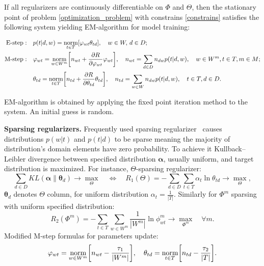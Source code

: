 \documentclass[12pt, twoside]{article}
\begin{document}
\begin{Theorem}
If all regularizers are continuously differentiable on $\Phi$ and $\Theta$, then the stationary point of problem \eqref{optimization_problem} with constrains \eqref{constrains} satisfies the following system yielding EM-algorithm for model training:

\begin{equation}
\label{EM_alrorithm}
	\begin{split}
	 \text{E-step}: \quad & p(t|d, w) = \norm\limits_{t \in T} [\phi_{wt} \theta_{td}], \quad w \in W, \, d \in D ;\\
	 \text{M-step}: \quad & \phi_{wt} = \norm\limits_{w \in W^m} \biggl[n_{wt} + \frac{\partial R}{\partial \phi_{wt}} \phi_{wt}\biggr], \quad n_{wt} = \sum_{d \in D} n_{dw} p(t| d, w), \quad w \in W^m, t \in T, m \in M;\\
	 & \theta_{td} = \norm\limits_{t \in T} \biggl[n_{td} + \frac{\partial R}{\partial \theta_{td}} \theta_{td}\biggr], \quad n_{td} = \sum_{w \in W} n_{dw} p(t| d, w), \quad t \in T, d \in D.
	 \end{split}
\end{equation}
\end{Theorem}
EM-algorithm is obtained by applying the fixed point iteration method to the system. An initial guess is random.

\textbf{Sparsing regularizers.} Frequently used sparsing regularizer~\cite{ARTM} causes distributions $p(w|t)$ and $p(t|d)$ to be sparse meaning the majority of distribution's domain elements have zero probability. To achieve it Kullback–Leibler divergence between specified distribution $\bm \alpha$, usually uniform, and target distribution is maximized. For instance, $\Theta$-sparsing regularizer:
\[
\sum_{d \in D} KL(\bm \alpha \| \bm \theta_d) \rightarrow \max_{\Theta} 
\quad
\Leftrightarrow
\quad
R_1(\Theta) = 
 - \sum_{d \in D} \sum_{t \in T} \alpha_t \ln \theta_{td} \rightarrow \max_{\Theta},
\]
$\bm \theta_d$ denotes $\Theta$ column, for uniform distribution $\alpha_t = \frac 1 {|T|}$. Similarly for $\Phi^m$ sparsing with uniform specified distribution:
\[
R_2(\Phi^m) = -\sum_{t \in T} \sum_{w \in W^m} \frac 1 {|W^m|} \ln \phi^m_{wt} \rightarrow \max_{\Phi^m} \quad \forall m.
\] 
Modified M-step formulas for parameters update:
\begin{equation}
\label{sparsing_M_step}
\phi_{wt} = \norm\limits_{w \in W^m} \biggl[n_{wt} - \frac {\tau_1} {|W^m|}\biggr],
\quad
\theta_{td} = \norm\limits_{t \in T} \biggl[n_{td} - \frac {\tau_2} {|T|}\biggr].
\end{equation}
\end{document}

